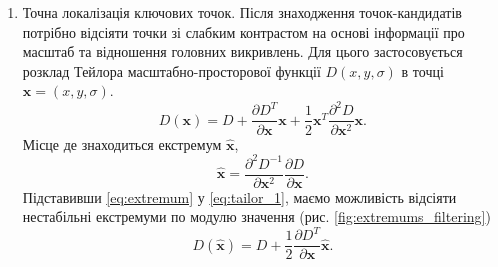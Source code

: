 \begin{enumerate}
    \item Точна локалізація ключових точок. Після знаходження точок-кандидатів потрібно
          відсіяти точки зі слабким контрастом на основі
          інформації про масштаб та відношення головних викривлень. Для цього застосовується розклад
          Тейлора масштабно-просторової функції $D(x,y,\sigma)$ в точці $\boldsymbol{x} = (x,y,\sigma)$.
          \begin{equation}
              D(\boldsymbol{x}) = D + \frac{\partial D^T }{\partial \boldsymbol{x} }\boldsymbol{x} +
              \frac{1}{2}\boldsymbol{x}^T\frac{\partial^2 D}{\partial \boldsymbol{x}^2}\boldsymbol{x}.
              \label{eq:tailor_1}
          \end{equation}
          Місце де знаходиться екстремум $\widehat{\boldsymbol{x}}$,
          \begin{equation}
              \widehat{\boldsymbol{x}} = \frac{\partial^2 D^{-1} }{\partial
                  \boldsymbol{x}^2}\frac{\partial D }{\partial \boldsymbol{x}}.
              \label{eq:extremum}
          \end{equation}
          Підставивши \eqref{eq:extremum} у \eqref{eq:tailor_1}, маємо можливість відсіяти нестабільні
          екстремуми по модулю значення (рис. \eqref{fig:extremums_filtering})
          \begin{equation*}
              D(\widehat{\boldsymbol{x}}) = D + \frac{1}{2}\frac{\partial D^{T} }{\partial \boldsymbol{x}}\widehat{\boldsymbol{x}}.
          \end{equation*}


\end{enumerate}
